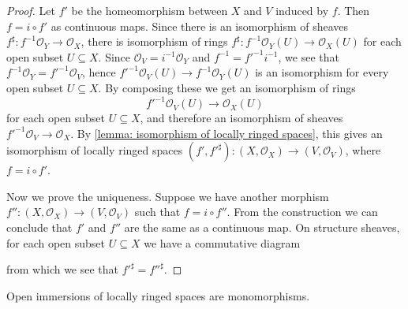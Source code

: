 \documentclass[11pt]{article}
\begin{document}
\begin{proof}
    Let $ f' $ be the homeomorphism between $ X $ and $ V $ induced by $ f $. 
    Then $ f=i \circ f' $ as continuous maps. 
    Since there is an isomorphism of sheaves $ f^{\sharp}: f^{-1}\mathscr{O}_{Y} \to \mathscr{O}_{X} $, 
    there is isomorphism of rings $ f^{\sharp}: f^{-1}\mathscr{O}_{Y}(U) \to \mathscr{O}_{X}(U) $ 
    for each open subset $ U \subseteq X $. 
    Since $ \mathscr{O}_{V} = i^{-1}\mathscr{O}_{Y} $ 
    and $ f^{-1} = f'^{-1} i^{-1} $, we see that $ f^{-1}\mathscr{O}_{Y}=f'^{-1}\mathscr{O}_{V} $, 
    hence $ f'^{-1}\mathscr{O}_{V}(U) \to f^{-1}\mathscr{O}_{Y}(U) $ 
    is an isomorphism for every open subset $ U \subseteq X $. 
    By composing these we get an isomorphism of rings 
    $$ f'^{-1}\mathscr{O}_{V}(U) \to \mathscr{O}_{X}(U) $$
    for each open subset $ U \subseteq X $, 
    and therefore an isomorphism of sheaves $ f'^{-1}\mathscr{O}_{V} \to \mathscr{O}_{X}$. 
    By \autoref{lemma: isomorphism of locally ringed spaces}, this gives an isomorphism of locally ringed spaces 
    $ (f',f'^{\sharp}):(X,\mathscr{O}_{X}) \to (V,\mathscr{O}_{V}) $, 
    where $ f = i \circ f' $. 

    Now we prove the uniqueness. Suppose we have another morphism 
    $ f'' : (X,\mathscr{O}_{X}) \to (V,\mathscr{O}_{V}) $ such that $ f = i \circ f'' $. 
    From the construction we can conclude that $ f' $ and $ f'' $ are the same as a continuous map. 
    On structure sheaves, for each open subset $ U \subseteq X $ we have a commutative diagram 
    \begin{center}
    \end{center}
    from which we see that $ f'^{\sharp} = f''^{\sharp} $. 
\end{proof}

\begin{proposition}
    \cite[Exercise 7.2.B]{vakilTheRisingSea} 
    Open immersions of locally ringed spaces are monomorphisms. 
\end{proposition}
\end{document}
